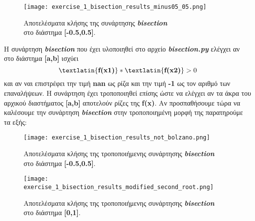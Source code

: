 \documentclass[First Project.tex]{subfiles}
\begin{document}
\begin{figure}[h!]
    \centering
    \captionsetup{justification=centering}
    \begin{center}
        \texttt{[image: exercise\_1\_bisection\_results\_minus05\_05.png]}    
        \caption{ Αποτελέσματα κλήσης της συνάρτησης \textit{\textlatin{\textbf{bisection}}} \\ στο διάστημα \textlatin{\textbf{[-0.5,0.5]}}. }
    \end{center}
\end{figure}

Η συνάρτηση \textit{\textlatin{\textbf{bisection}}} που έχει υλοποιηθεί στο αρχείο 
\textit{\textlatin{\textbf{bisection.py}}} ελέγχει αν στο διάστημα \textlatin{\textbf{[a,b]}} ισχύει 
\begin{equation*}
    \textlatin{\textbf{f(x1)}} * \textlatin{\textbf{f(x2)}} > 0
\end{equation*}
και αν ναι επιστρέφει την τιμή \textlatin{\textbf{nan}} ως ρίζα και την τιμή \textbf{-1} ως τον αριθμό των επαναλήψεων. Η συνάρτηση
έχει τροποποιηθεί επίσης ώστε να ελέγχει αν τα άκρα του αρχικού διαστήματος \textlatin{\textbf{[a,b]}} αποτελούν ρίζες της \textlatin{\textbf{f(x)}}.
Αν προσπαθήσουμε τώρα να καλέσουμε την συνάρτηση \textit{\textlatin{\textbf{bisection}}} στην τροποποιημένη μορφή της παρατηρούμε τα εξής:
\vspace{5px}
\begin{figure}[h!]
    \centering
    \captionsetup{justification=centering}
    \begin{center}
        \texttt{[image: exercise\_1\_bisection\_results\_not\_bolzano.png]}    
        \caption{ Αποτελέσματα κλήσης της τροποποιήμενης συνάρτησης \textit{\textlatin{\textbf{bisection}}} \\ στο διάστημα \textlatin{\textbf{[-0.5,0.5]}}. }
    \end{center}
\end{figure}
\vspace{5px}
\begin{figure}[h!]
    \centering
    \captionsetup{justification=centering}
    \begin{center}
        \texttt{[image: exercise\_1\_bisection\_results\_modified\_second\_root.png]}    
        \caption{ Αποτελέσματα κλήσης της τροποποιήμενης συνάρτησης \textit{\textlatin{\textbf{bisection}}} \\ στο διάστημα \textlatin{\textbf{[0,1]}}. }
    \end{center}
\end{figure}
\end{document}

